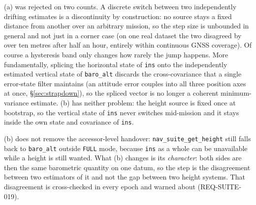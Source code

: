 \documentclass[11pt,a4paper]{article}
\newcommand{\code}[1]{\texttt{#1}}
\begin{document}
\begin{description}
    (a) was rejected on two counts. A discrete switch between two
    independently drifting estimates is a discontinuity by construction: no
    source stays a fixed distance from another over an arbitrary mission, so the
    step size is unbounded in general and not just in a corner case (on one real
    dataset the two disagreed by over ten metres after half an hour, entirely
    within continuous GNSS coverage). Of course a hysteresis band only changes how rarely
    the jump happens. More fundamentally, splicing the horizontal state of
    \code{ins} onto the independently estimated vertical state of
    \code{baro\_\allowbreak{}alt} discards the
    cross-covariance that a single error-state filter maintains (an attitude error
    couples into all three position axes at once, \S\ref{sec:strapdown}), so the
    spliced vector is no longer a coherent minimum-variance estimate. (b) has
    neither problem: the height source is fixed once at bootstrap, so the
    vertical state of \code{ins} never switches mid-mission and it stays inside
    the own state and covariance of \code{ins}.

    (b) does not remove the accessor-level handover:
    \code{nav\_\allowbreak{}suite\_\allowbreak{}get\_\allowbreak{}height} still falls back to \code{baro\_\allowbreak{}alt} outside
    \code{FULL} mode, because \code{ins} as a whole can be unavailable while a
    height is still wanted. What (b) changes is its \emph{character}: both
    sides are then the same barometric quantity on one datum, so the step is the
    disagreement between two estimators of it and not the gap between two
    height systems. That disagreement is cross-checked in every epoch and warned
    about (REQ-SUITE-019).


\end{description}
\end{document}
